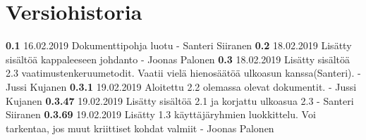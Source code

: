 \chapter*{Versiohistoria}

\newcommand{\currentversion}{0.3.69} %

\textbf{0.1} 16.02.2019 Dokumenttipohja luotu - Santeri Siiranen \newline
\textbf{0.2} 18.02.2019 Lisätty sisältöä kappaleeseen johdanto - Joonas Palonen \newline
\textbf{0.3} 18.02.2019 Lisätty sisältöä 2.3 vaatimustenkeruumetodit. Vaatii vielä hienosäätöä ulkoasun kanssa(Santeri). - Jussi Kujanen \newline
\textbf{0.3.1} 19.02.2019 Aloitettu 2.2 olemassa olevat dokumentit. - Jussi Kujanen \newline
\textbf{0.3.47} 19.02.2019 Lisätty sisältöä 2.1 ja korjattu ulkoasua 2.3 - Santeri Siiranen \newline
\textbf{0.3.69} 19.02.2019 Lisätty 1.3 käyttäjäryhmien luokkittelu. Voi tarkentaa, jos muut kriittiset kohdat valmiit - Joonas Palonen \newline
